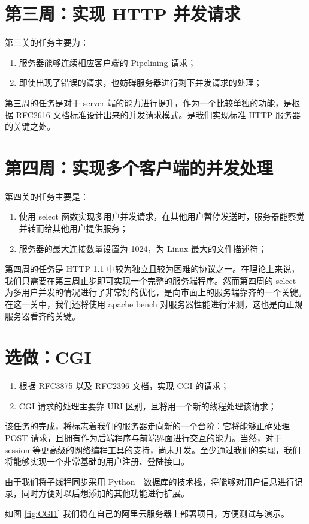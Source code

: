 \section{第三周：实现 HTTP 并发请求} 第三关的任务主要为：
\begin{enumerate}
    \item 服务器能够连续相应客户端的 Pipelining 请求； 
    \item 即使出现了错误的请求，也妨碍服务器进行剩下并发请求的处理；
\end{enumerate}

第三周的任务是对于 server 端的能力进行提升，作为一个比较单独的功能，是根据 RFC2616 文档标准设计出来的并发请求模式。是我们实现标准 HTTP 服务器的关键之处。

\section{第四周：实现多个客户端的并发处理} 第四关的任务主要是：
\begin{enumerate}
    \item 使用 select 函数实现多用户并发请求，在其他用户暂停发送时，服务器能察觉并转而给其他用户提供服务；
    \item 服务器的最大连接数量设置为 1024，为 Linux 最大的文件描述符；
\end{enumerate}

第四周的任务是 HTTP 1.1 中较为独立且较为困难的协议之一。在理论上来说，我们只需要在第三周止步即可实现一个完整的服务端程序。然而第四周的 select 为多用户并发的情况进行了非常好的优化，是向市面上的服务端靠齐的一个关键。在这一关中，我们还将使用 apache bench 对服务器性能进行评测，这也是向正规服务器看齐的关键。

\section{选做：CGI}
\begin{enumerate}
    \item 根据 RFC3875 以及 RFC2396 文档，实现 CGI 的请求；
    \item CGI 请求的处理主要靠 URI 区别，且将用一个新的线程处理该请求；
\end{enumerate}

该任务的完成，将标志着我们的服务器走向新的一个台阶：它将能够正确处理 POST 请求，且拥有作为后端程序与前端界面进行交互的能力。当然，对于 session 等更高级的网络编程工具的支持，尚未开发。至少通过我们的实现，我们将能够实现一个非常基础的用户注册、登陆接口。

由于我们将子线程同步采用 Python - 数据库的技术栈，将能够对用户信息进行记录，同时方便对以后想添加的其他功能进行扩展。

如图 \ref{fig:CGI1} 我们将在自己的阿里云服务器上部署项目，方便测试与演示。




